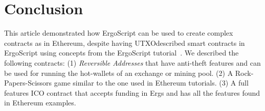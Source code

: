 \documentclass[runningheads]{llncs}
\newcommand{\langname}{ErgoScript\xspace}
\begin{document}

\section{Conclusion}

This article demonstrated how \langname can be used to create complex contracts as in Ethereum, despite having UTXOdescribed smart contracts in \langname using concepts from the \langname tutorial~\cite{whitepaper}.
We described the following contracts: (1) {\em Reversible Addresses} that have anti-theft features and can be used for running the hot-wallets of an exchange or mining pool. (2) A Rock-Papers-Scissors game similar to the one used in Ethereum tutorials. (3) A full features ICO contract that accepts funding in Ergs and has all the features found in Ethereum examples.



\end{document}
